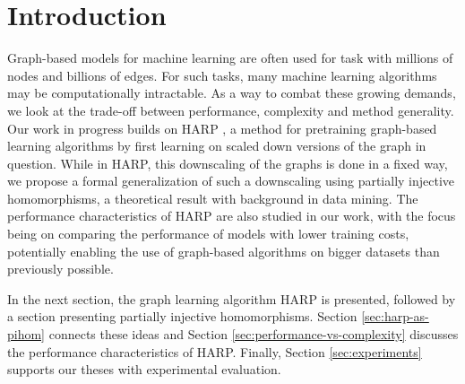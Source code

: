 \section{Introduction}

Graph-based models for machine learning are often used for task with millions of nodes and billions of edges. For such tasks, many machine learning algorithms may be computationally intractable. As a way to combat these growing demands, we look at the trade-off between performance, complexity and method generality. Our work in progress builds on HARP \cite{chen_harp_2018}, a method for pretraining graph-based learning algorithms by first learning on scaled down versions of the graph in question. While in HARP, this downscaling of the graphs is done in a fixed way, we propose a formal generalization of such a downscaling using partially injective homomorphisms, a theoretical result with background in data mining. The performance characteristics of HARP are also studied in our work, with the focus being on comparing the performance of models with lower training costs, potentially enabling the use of graph-based algorithms on bigger datasets than previously possible.

In the next section, the graph learning algorithm HARP is presented, followed by a section presenting partially injective homomorphisms. Section \ref{sec:harp-as-pihom} connects these ideas and Section \ref{sec:performance-vs-complexity} discusses the performance characteristics of HARP. Finally, Section \ref{sec:experiments} supports our theses with experimental evaluation.
